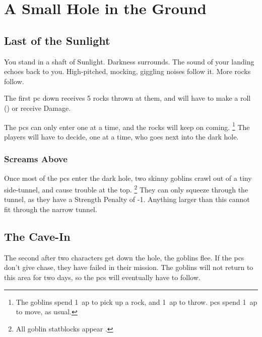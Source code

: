 \section{A Small Hole in the Ground}
\renewcommand\npcsymbol{\gls{night}}
\label{goblinCaveEntrance}

\begin{multicols}{2}

\subsection{Last of the Sunlight}

\begin{boxtext}
  You stand in a shaft of Sunlight.
  Darkness surrounds.
  The sound of your landing echoes back to you.
  High-pitched, mocking, giggling noises follow it.
  More rocks follow.
\end{boxtext}

The first \gls{pc} down receives 5 rocks thrown at them, and will have to make a  roll (\tn[10]) or receive  Damage.

The \glspl{pc} can only enter one at a time, and the rocks will keep on coming.%
\footnote{The goblins spend 1~\gls{ap} to pick up a rock, and 1~\gls{ap} to throw.
\Glspl{pc} spend 1~\gls{ap} to move, as usual.}
The players will have to decide, one at a time, who goes next into the dark hole.

\subsubsection{Screams Above}

Once most of the \glspl{pc} enter the dark hole, two skinny goblins crawl out of a tiny side-tunnel, and cause trouble at the top.%
\footnote{All goblin statblocks appear .}
They can only squeeze through the tunnel, as they have a Strength Penalty of -1.
Anything larger than this cannot fit through the narrow tunnel.

\subsection{The Cave-In}

The second after two characters get down the hole, the goblins flee.
If the \glspl{pc} don't give chase, they have failed in their mission.
The goblins will not return to this area for two days, so the \glspl{pc} will eventually have to follow.


\end{multicols}

